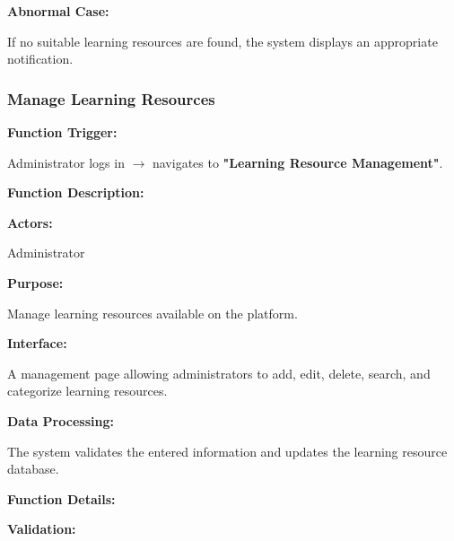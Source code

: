 \textbf{Abnormal Case:}

If no suitable learning resources are found, the system displays an appropriate notification.

%

\subsubsection{Manage Learning Resources}

\textbf{Function Trigger:}

Administrator logs in $\rightarrow$ navigates to \textbf{"Learning Resource Management"}.

\vspace{0.3cm}

\textbf{Function Description:}

\textbf{Actors:}

Administrator

\vspace{0.2cm}

\textbf{Purpose:}

Manage learning resources available on the platform.

\vspace{0.2cm}

\textbf{Interface:}

A management page allowing administrators to add, edit, delete, search, and categorize learning resources.

\vspace{0.2cm}

\textbf{Data Processing:}

The system validates the entered information and updates the learning resource database.

\vspace{0.3cm}

\textbf{Function Details:}

\textbf{Validation:}

